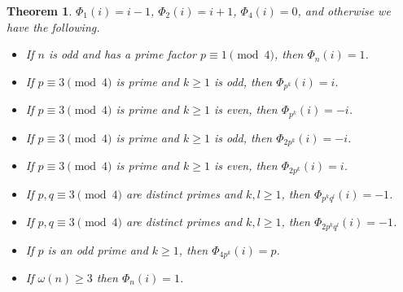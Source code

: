 \documentclass{amsart}
\newtheorem{theorem}{Theorem}
\theoremstyle{definition}
\begin{document}
\begin{theorem}
$\Phi_1(i)=i-1$, $\Phi_2(i) = i+1$, $\Phi_4(i)=0$, and otherwise
we have the following.

\begin{itemize}
\item If $n$ is odd and has a prime factor $p \equiv 1 \pmod{4}$, then $\Phi_n(i)=1$.
\item If $p \equiv 3 \pmod{4}$ is prime and $k \geq 1$ is odd, then
$\Phi_{p^k}(i) = i$.
\item If $p \equiv 3 \pmod{4}$ is prime and $k \geq 1$ is even, then
$\Phi_{p^k}(i) = -i$.
\item If $p \equiv 3 \pmod{4}$ is prime and $k \geq 1$ is odd, then
$\Phi_{2p^k}(i)=-i$. 
\item If $p \equiv 3 \pmod{4}$ is prime and $k \geq 1$ is even, then
$\Phi_{2p^k}(i)=i$.
\item If $p,q \equiv 3 \pmod{4}$ are distinct primes and $k, l \geq 1$, then
$\Phi_{p^k q^l}(i) = -1$.
\item If $p,q \equiv 3 \pmod{4}$ are distinct primes and $k, l \geq 1$, then
$\Phi_{2p^k q^l}(i) = -1$.
\item If $p$ is an odd prime and $k \geq 1$, then $\Phi_{4p^k}(i)=p$. 
\item If $\omega(n) \geq 3$ then $\Phi_n(i)=1$. 
\end{itemize}
\end{theorem}
\end{document}
